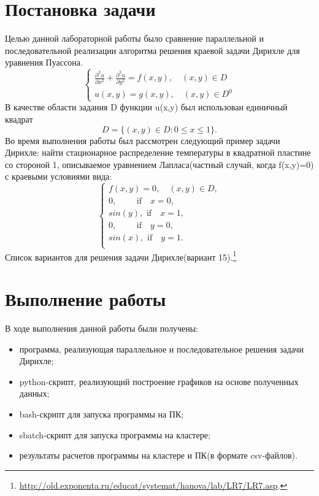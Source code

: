 \documentclass[12pt]{article}
\begin{document}
\section{Постановка задачи}
Целью данной лабораторной работы было сравнение параллельной и последовательной реализации алгоритма решения краевой задачи Дирихле для уравнения Пуассона.
	\[
	\begin{cases}
	\frac{\partial^2u}{\partial x^2} + \frac{\partial^2u}{\partial y^2} = f(x,y)  ,\quad(x,y)\in D\\
	u(x,y)=g(x,y) ,\quad(x,y)\in D^{0}
	\end{cases}
	\]
В качестве области задания D функции u(x,y) был использован единичный квадрат 
\[D=\{(x,y)\in D: 0 \leq x \leq 1\}.\]
Во время выполнения работы был рассмотрен следующий пример задачи Дирихле:
найти стационарное распределение температуры в квадратной пластине со стороной 1, описываемое уравнением Лапласа(частный случай, когда f(x,y)=0)
с краевыми условиями вида:
	\[
	\begin{cases}
	f(x,y)=0, \quad(x,y)\in D,\\
	0 , \qquad \text{ if}  \quad x=0, \\
	sin(y) ,\text{ if}\quad x=1, \\
	0 , \qquad \text{ if}\quad y=0, \\
	sin(x) ,\text{ if}\quad y=1. \\
	\end{cases}
	\]
Список вариантов для решения задачи Дирихле(вариант 15).\footnote{\url{http://old.exponenta.ru/educat/systemat/hanova/lab/LR7/LR7.asp}.}
\section{Выполнение работы}
В ходе выполнения данной работы были получены:
	\begin{itemize}
		\item программа, реализующая параллельное и последовательное решения задачи Дирихле;
		\item python-скрипт, реализующий построение графиков на основе полученных данных;
		\item bash-скрипт для запуска программы на ПК;
		\item sbatch-скрипт для запуска программы на кластере;
		\item результаты расчетов программы на кластере и ПК(в формате csv-файлов).
	\end{itemize}
\end{document}
